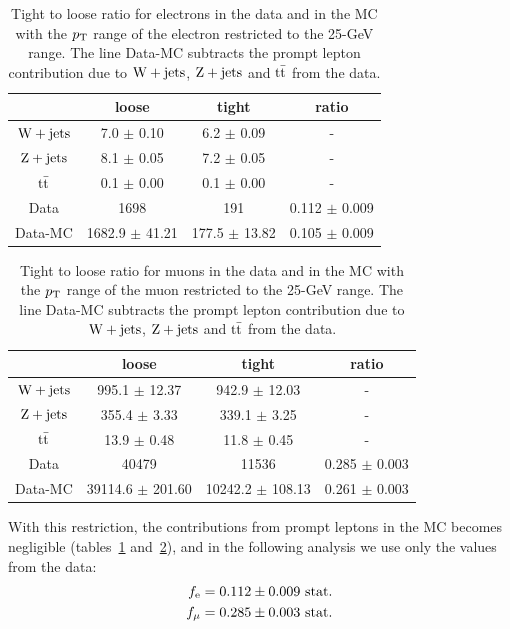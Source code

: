 \begin{table}[htb]
    \centering
\begin{tabular}{*4c}
    \toprule
 & 	 loose & 	 tight & 	 ratio \\
 \midrule
$\mathrm{W} + \text{jets}$ & 	 7.0 $\pm$ 0.10 & 	 6.2 $\pm$ 0.09 & 	- \\
$\mathrm{Z} + \text{jets}$ & 	 8.1 $\pm$ 0.05 & 	 7.2 $\pm$ 0.05 & 	- \\
$\mathrm{t}\bar{\mathrm{t}}$ & 	 0.1 $\pm$ 0.00 & 	 0.1 $\pm$ 0.00 & 	- \\
\midrule
Data & 	 1698 & 	  191 & 	0.112 $\pm$ 0.009 \\
Data-MC &	1682.9 $\pm$ 41.21 & 	177.5 $\pm$ 13.82 & 	0.105 $\pm$ 0.009 \\
\bottomrule
\end{tabular}
\caption{Tight to loose ratio for electrons in the data and in the MC with
    the $p_\mathrm{T}$ range of
    the electron restricted to the 25-\unit[35]{GeV} range.
The line Data-MC subtracts the prompt lepton contribution due to $\mathrm{W} + \text{jets}$,
$\mathrm{Z} + \text{jets}$ and $\mathrm{t}\bar{\mathrm{t}}$ from the data.}
\label{tab:FRwMCEl_Pt2535}
\end{table}


\begin{table}[htb]
    \centering
\begin{tabular}{*4c}
    \toprule
 & 	 loose & 	 tight & 	 ratio \\
 \midrule
$\mathrm{W} + \text{jets}$ & 	995.1 $\pm$ 12.37 & 	942.9 $\pm$ 12.03 & 	- \\
$\mathrm{Z} + \text{jets}$ & 	355.4 $\pm$ 3.33 & 	339.1 $\pm$ 3.25 & 	- \\
$\mathrm{t}\bar{\mathrm{t}}$ & 	13.9 $\pm$ 0.48 & 	11.8 $\pm$ 0.45 & 	- \\
\midrule
Data & 	40479 & 	11536 & 	0.285 $\pm$ 0.003 \\
Data-MC &	39114.6 $\pm$ 201.60 & 	10242.2 $\pm$ 108.13 & 	0.261 $\pm$ 0.003 \\
\bottomrule
\end{tabular}
\caption{Tight to loose ratio for muons in the data and in the MC with the
    $p_\mathrm{T}$ range of the muon restricted to the 25-\unit[35]{GeV} range. 
The line Data-MC subtracts the prompt lepton contribution due to $\mathrm{W} + \text{jets}$,
$\mathrm{Z} + \text{jets}$ and $\mathrm{t}\bar{\mathrm{t}}$ from the data.}
\label{tab:FRwMCMu_Pt2535}
\end{table}

With this \pt restriction, the contributions from prompt leptons in the MC
becomes negligible (tables~\ref{tab:FRwMCEl_Pt2535}
and~\ref{tab:FRwMCMu_Pt2535}), and in the following analysis we use only the values
from the data:
\begin{align*}
    f_{\mathrm{e}} &= 0.112 \pm 0.009 \text{ stat.}\\
    f_{\mu} &= 0.285 \pm 0.003 \text{ stat.}
\end{align*}

